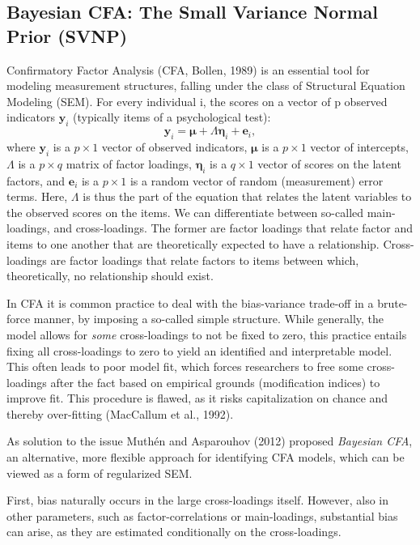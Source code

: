 \documentclass[
  english,
  man, donotrepeattitle,floatsintext]{apa6}
\begin{document}
\hypertarget{bayesian-cfa-the-small-variance-normal-prior-svnp}{%
\subsection{Bayesian CFA: The Small Variance Normal Prior (SVNP)}\label{bayesian-cfa-the-small-variance-normal-prior-svnp}}

Confirmatory Factor Analysis (CFA, Bollen, 1989) is an essential tool for modeling measurement structures, falling under the class of Structural Equation Modeling (SEM). For every individual i, the scores on a vector of p observed indicators \(\mathbf{y}_i\) (typically items of a psychological test):
\[\boldsymbol{y}_i = \boldsymbol{\mu} + \Lambda \boldsymbol{\eta}_i + \boldsymbol{e}_i ,\]
where \(\boldsymbol{y}_i\) is a \(p \times 1\) vector of observed indicators, \(\boldsymbol{\mu}\) is a \(p \times 1\) vector of intercepts, \(\Lambda\) is a \(p \times q\) matrix of factor loadings, \(\boldsymbol{\eta}_i\) is a \(q \times 1\) vector of scores on the latent factors, and \(\boldsymbol{e}_i\) is a \(p \times 1\) is a random vector of random (measurement) error terms. Here, \(\Lambda\) is thus the part of the equation that relates the latent variables to the observed scores on the items. We can differentiate between so-called main-loadings, and cross-loadings. The former are factor loadings that relate factor and items to one another that are theoretically expected to have a relationship. Cross-loadings are factor loadings that relate factors to items between which, theoretically, no relationship should exist.

In CFA it is common practice to deal with the bias-variance trade-off in a brute-force manner, by imposing a so-called simple structure. While generally, the model allows for \emph{some} cross-loadings to not be fixed to zero, this practice entails fixing all cross-loadings to zero to yield an identified and interpretable model. This often leads to poor model fit, which forces researchers to free some cross-loadings after the fact based on empirical grounds (modification indices) to improve fit. This procedure is flawed, as it risks capitalization on chance and thereby over-fitting (MacCallum et al., 1992).

As solution to the issue Muthén and Asparouhov (2012) proposed \emph{Bayesian CFA}, an alternative, more flexible approach for identifying CFA models, which can be viewed as a form of regularized SEM.

First, bias naturally occurs in the large cross-loadings itself. However, also in other parameters, such as factor-correlations or main-loadings, substantial bias can arise, as they are estimated conditionally on the cross-loadings.
\end{document}
